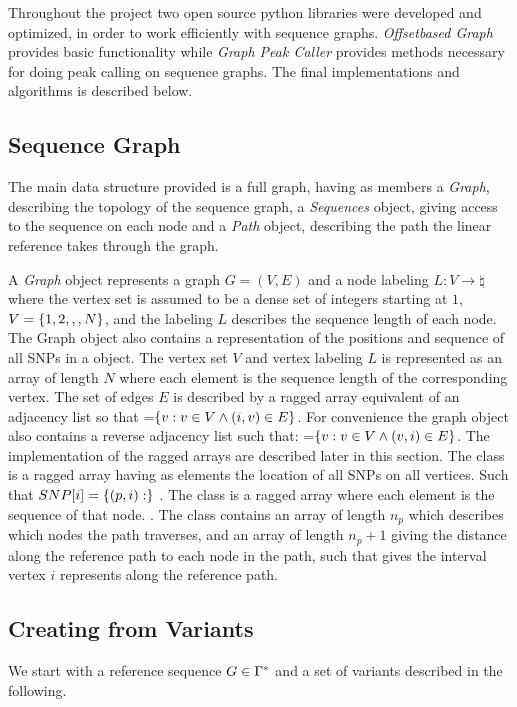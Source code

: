 Throughout the project two open source python libraries were developed and optimized, in order to work efficiently with sequence graphs. \emph{Offsetbased Graph} provides basic functionality while \emph{Graph Peak Caller} provides methods necessary for doing peak calling on sequence graphs. The final implementations and algorithms is described below. 

\subsection{Sequence Graph}
The main data structure provided is a full graph, having as members a \emph{Graph}, describing the topology of the sequence graph, a \emph{Sequences} object, giving access to the sequence on each node and a \emph{Path} object, describing the path the linear reference takes through the graph. 

A \emph{Graph} object represents a graph $G = (V, E)$ and a node labeling $L: V \rightarrow \natural$ where the vertex set is assumed to be a dense set of integers starting at $1$, $V=\left\{1, 2, , , N\right\}$, and the labeling $L$ describes the sequence length of each node. The Graph object also contains a representation of the positions and sequence of all SNPs in a  object. 
  The vertex set $V$ and vertex labeling $L$ is represented as an array of length $N$ where each element is the sequence length of the corresponding vertex.
  The set of edges $E$ is described by a ragged array  equivalent of an adjacency list so that =$\left\{v : v \in V \wedge (i, v) \in E\right\}$. For convenience the graph object also contains a reverse adjacency list such that: =$\left\{v : v \in V \wedge (v, i) \in E\right\}$. The implementation of the ragged arrays are described later in this section.
  The  class is a ragged array having as elements the location of all SNPs on all vertices. Such that $SNP[i] = \left\{(p, i):\right\} $ . 
The  class is a ragged array where each element is the sequence of that node. . 
The  class contains an array  of length $n_p$ which describes which nodes the path traverses, and an array  of length $n_p+1$ giving the distance along the reference path to each node in the path, such that  gives the interval vertex $i$ represents along the reference path.
\subsection{Creating from Variants}
We start with a reference sequence $G \in \Gamma^*$ and a set of variants described in the following.


